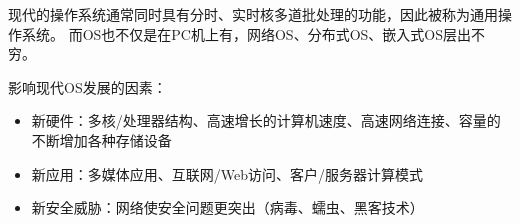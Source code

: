 现代的操作系统通常同时具有分时、实时核多道批处理的功能，因此被称为通用操作系统。
而OS也不仅是在PC机上有，网络OS、分布式OS、嵌入式OS层出不穷。


影响现代OS发展的因素：
\begin{itemize}
	\item 新硬件：多核/处理器结构、高速增长的计算机速度、高速网络连接、容量的不断增加各种存储设备
	\item 新应用：多媒体应用、互联网/Web访问、客户/服务器计算模式
	\item 新安全威胁：网络使安全问题更突出（病毒、蠕虫、黑客技术）
\end{itemize}


